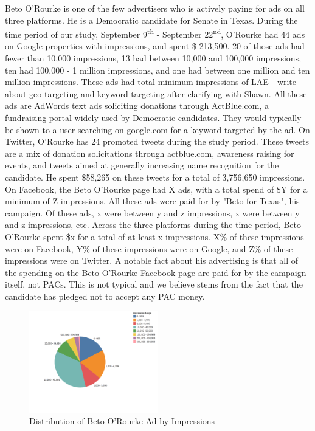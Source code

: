 \documentclass[fleqn,10pt]{wlscirep}
\begin{document}
Beto O'Rourke is one of the few advertisers who is actively paying for ads on all three platforms. He is a Democratic candidate for Senate in Texas. During the time period of our study, September 9\textsuperscript{th} - September 22\textsuperscript{nd}, O'Rourke had 44 ads on Google properties with impressions, and spent \$ 213,500. 20 of those ads had fewer than 10,000 impressions, 13 had between 10,000 and 100,000 impressions, ten had 100,000 - 1 million impressions, and one had between one million and ten million impressions. These ads had total minimum impressions of LAE - write about geo targeting and keyword targeting after clarifying with Shawn. All these ads are AdWords text ads soliciting donations through ActBlue.com, a fundraising portal widely used by Democratic candidates. They would typically be shown to a user searching on google.com for a keyword targeted by the ad.
On Twitter, O'Rourke has 24 promoted tweets during the study period. These tweets are a mix of donation solicitations through actblue.com, awareness raising for events, and tweets aimed at generally increasing name recognition for the candidate. He spent \$58,265 on these tweets for a total of 3,756,650 impressions.
On Facebook, the Beto O'Rourke page had X ads, with a total spend of \$Y for a minimum of Z impressions. All these ads were paid for by "Beto for Texas", his campaign. Of these ads, x were between y and z impressions, x were between y and z impressions, etc.
Across the three platforms during the time period, Beto O'Rourke spent \$x for a total of at least x impressions. X\% of these impressions were on Facebook, Y\% of these impressions were on Google, and Z\% of these impressions were on Twitter. A notable fact about his advertising is that  all of the spending on the Beto O'Rourke Facebook page are paid for by the campaign itself, not PACs. This is not typical and we believe stems from the fact that the candidate has pledged not to accept any PAC money.
\begin{figure}
    \centering
    \centering
    \includegraphics[width=0.5\textwidth]{beto_impression_pie.png}
    \caption{Distribution of Beto O'Rourke Ad by Impressions}
    \label{fig:beto_impression_pie}
\end{figure}
\end{document}
